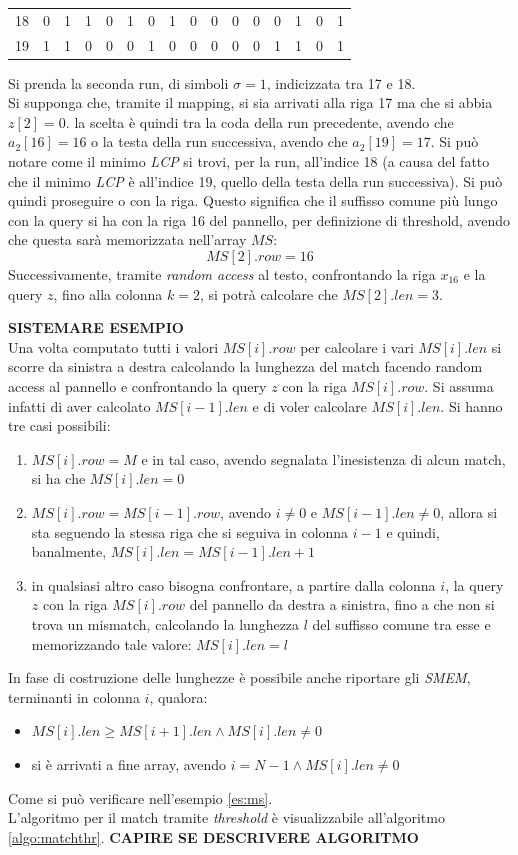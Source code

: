 \begin{esempio}
\begin{table}[H]
\begin{tabular}{c|cc|c|cccccccccccc}
      18 & 0 & 1 & 1 & 0 & 1 & 0 & 1 & 0 & 0 & 0 & 0 & 0 & 1 & 0 & 1 \\
      19 & 1 & 1 & 0 & 0 & 0 & 1 & 0 & 0 & 0 & 0 & 0 & 1 & 1 & 0 & 1 \\
    \end{tabular}
  \end{table}
  Si prenda la seconda run, di simboli $\sigma=1$, indicizzata tra 17 e 18. \\
  Si supponga che, tramite il mapping, si sia arrivati alla riga 17 ma che si
  abbia $z[2]=0$. la scelta è quindi tra la coda della run precedente, avendo
  che $a_2[16]=16$ o la testa della run successiva, avendo che $a_2[19]=17$. Si
  può notare come il minimo \textit{LCP} si trovi, per la 
  run, all'indice 18 (a causa del fatto che il minimo \textit{LCP} è all'indice
  19, quello della testa della run successiva). Si può quindi proseguire o con
  la riga. Questo significa che il suffisso comune più lungo con la query si ha
  con la riga 16 del pannello, per definizione di threshold, avendo che questa
  sarà memorizzata nell'array $MS$:
  \[MS[2].row=16\]
  Successivamente, tramite \textit{random access} al testo, confrontando la riga
  $x_{16}$ e la query $z$, fino alla colonna $k=2$, si potrà calcolare che
  $MS[2].len=3$. 
\end{esempio}
\textbf{SISTEMARE ESEMPIO}\\
Una volta computato tutti i valori $MS[i].row$ per calcolare i vari $MS[i].len$
si scorre da sinistra a destra calcolando la lunghezza del match facendo random
access al pannello e confrontando la query $z$ con la riga $MS[i].row$. Si
assuma infatti di aver calcolato $MS[i-1].len$ e di voler calcolare $MS[i].len$.
Si hanno tre casi possibili:
\begin{enumerate}
  \item $MS[i].row=M$ e in tal caso, avendo segnalata l'inesistenza di alcun
  match, si ha che $MS[i].len=0$
  \item $MS[i].row=MS[i-1].row$, avendo $i\neq 0$ e $MS[i-1].len\neq 0$, allora
  si sta seguendo la stessa riga che si seguiva in colonna $i-1$ e quindi,
  banalmente, $MS[i].len=MS[i-1].len+1$
  \item in qualsiasi altro caso bisogna confrontare, a partire dalla colonna
  $i$, la query 
  $z$ con la riga $MS[i].row$ del pannello da destra a sinistra, fino a che non
  si trova un mismatch, calcolando la lunghezza $l$ del suffisso comune tra esse
  e memorizzando tale valore: $MS[i].len=l$
\end{enumerate}
In fase di costruzione delle lunghezze è possibile anche riportare gli
\textit{SMEM}, terminanti in colonna $i$, qualora:
\begin{itemize}
  \item $MS[i].len\geq MS[i+1].len \land MS[i].len\neq 0$
  \item si è arrivati a fine array, avendo $i=N-1\land MS[i].len\neq 0$
\end{itemize}
Come si può verificare nell'esempio \ref{es:ms}.\\
L'algoritmo per il match tramite \textit{threshold} è visualizzabile
all'algoritmo \ref{algo:matchthr}.
\textbf{CAPIRE SE DESCRIVERE ALGORITMO}

